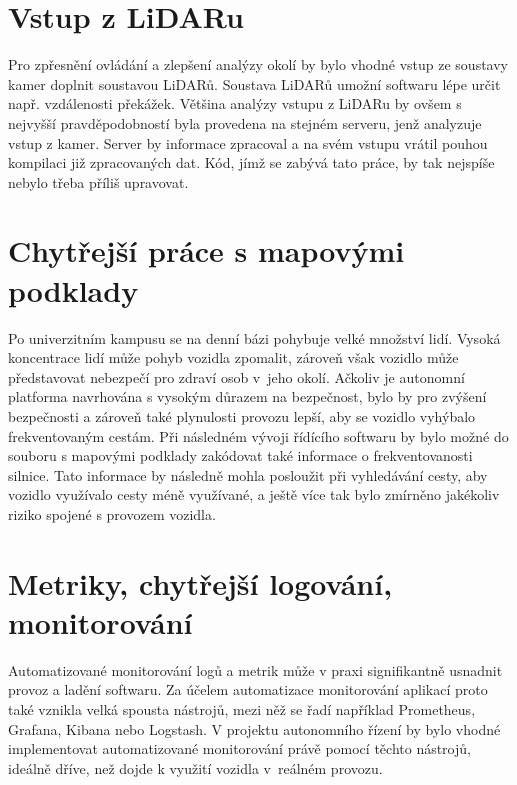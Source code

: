 \documentclass[czech, bachelor]{diploma}
\begin{document}
\section{Vstup z LiDARu}

Pro zpřesnění ovládání a zlepšení analýzy okolí by bylo vhodné vstup ze soustavy kamer doplnit soustavou LiDARů. Soustava LiDARů
umožní softwaru lépe určit např. vzdálenosti překážek. Většina analýzy vstupu z LiDARu by ovšem s nejvyšší pravděpodobností byla
provedena na stejném serveru, jenž analyzuje vstup z kamer. Server by informace zpracoval a na svém vstupu vrátil pouhou kompilaci
již zpracovaných dat. Kód, jímž se zabývá tato práce, by tak nejspíše nebylo třeba příliš upravovat.

\section{Chytřejší práce s mapovými podklady} \label{smarter-maps}

Po univerzitním kampusu se na denní bázi pohybuje velké množství lidí. Vysoká koncentrace lidí může pohyb vozidla zpomalit,
zároveň však vozidlo může představovat nebezpečí pro zdraví osob v~jeho okolí. Ačkoliv je autonomní platforma navrhována s vysokým
důrazem na bezpečnost, bylo by pro zvýšení bezpečnosti a zároveň také plynulosti provozu lepší, aby se vozidlo vyhýbalo
frekventovaným cestám. Při následném vývoji řídícího softwaru by bylo možné do souboru s mapovými podklady zakódovat také
informace o frekventovanosti silnice. Tato informace by následně mohla posloužit při vyhledávání cesty, aby vozidlo využívalo
cesty méně využívané, a ještě více tak bylo zmírněno jakékoliv riziko spojené s provozem vozidla.

\section{Metriky, chytřejší logování, monitorování}

Automatizované monitorování logů\cite{elk-source} a metrik\cite{prometheus-source} může v praxi signifikantně usnadnit provoz a
ladění softwaru. Za účelem automatizace monitorování aplikací proto také vznikla velká spousta nástrojů, mezi něž se řadí
například Prometheus\cite{prometheus-source}, Grafana\cite{prometheus-source}, Kibana nebo Logstash\cite{elk-source}.
V projektu autonomního řízení by bylo vhodné implementovat automatizované monitorování právě pomocí těchto nástrojů, ideálně
dříve, než dojde k využití vozidla v~reálném provozu.
\end{document}
